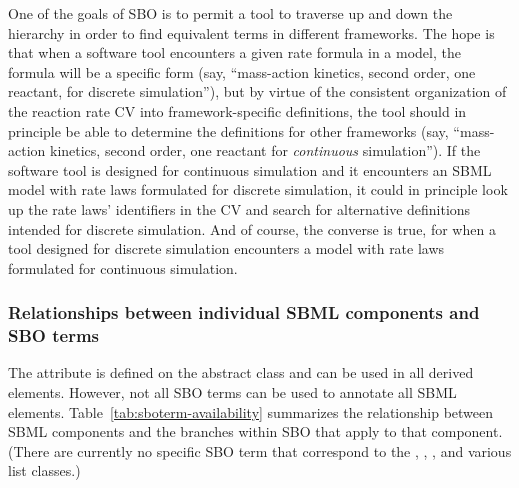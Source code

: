One of the goals of SBO is to permit a tool to traverse up and
down the hierarchy in order to find equivalent terms in different
frameworks.  The hope is that when a software tool encounters a
given rate formula in a model, the formula will be a specific form
(say, ``mass-action kinetics, second order, one reactant, for
discrete simulation''), but by virtue of the consistent
organization of the reaction rate CV into framework-specific
definitions, the tool should in principle be able to determine the
definitions for other frameworks (say, ``mass-action kinetics,
second order, one reactant for \emph{continuous} simulation'').
If the software tool is designed for continuous simulation and it
encounters an SBML model with rate laws formulated for discrete
simulation, it could in principle look up the rate laws'
identifiers in the CV and search for alternative definitions
intended for discrete simulation.  And of course, the converse is
true, for when a tool designed for discrete simulation encounters
a model with rate laws formulated for continuous simulation.

\subsubsection{Relationships between individual SBML components and SBO terms}

The  attribute is defined on the abstract
  class \SBase and can be used in all derived elements.  However,
not all SBO terms can be used to annotate all
  SBML elements.  Table~\ref{tab:sboterm-availability} summarizes
the relationship between SBML components and the branches within
SBO that apply to that component.  (There are currently
  no specific SBO term that correspond to the \Sbml,
  \UnitDefinition, \Unit, and various
   list classes.)

